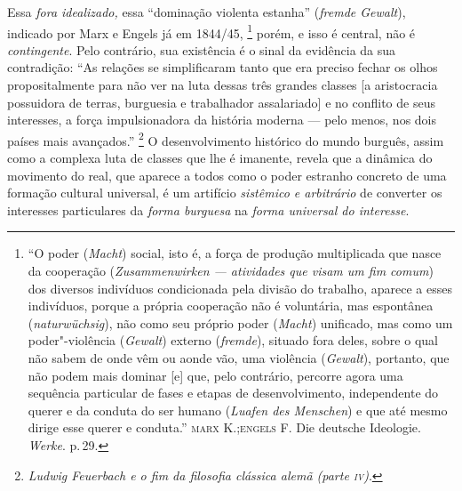 Essa \emph{fora idealizado,} essa ``dominação violenta estanha''
(\emph{fremde Gewalt}), indicado por Marx e Engels já em 1844/45,
\footnote{``O poder (\emph{Macht}) social, isto é, a força de produção
  multiplicada que nasce da cooperação (\emph{Zusammenwirken ---
  atividades que visam um fim comum}) dos diversos indivíduos
  condicionada pela divisão do trabalho, aparece a esses indivíduos,
  porque a própria cooperação não é voluntária, mas espontânea
  (\emph{naturwüchsig}), não como seu próprio poder (\emph{Macht})
  unificado, mas como um poder"-violência (\emph{Gewalt}) externo
  (\emph{fremde}), situado fora deles, sobre o qual não sabem de onde
  vêm ou aonde vão, uma violência (\emph{Gewalt}), portanto, que não
  podem mais dominar {[}e{]} que, pelo contrário, percorre agora uma
  sequência particular de fases e etapas de desenvolvimento,
  independente do querer e da conduta do ser humano (\emph{Luafen des
  Menschen}) e que até mesmo dirige esse querer e conduta.'' \textsc{marx}
  K.;\textsc{engels} F. Die deutsche Ideologie. \emph{Werke}. p.\,29.} porém, e
isso é central, não é \emph{contingente}. Pelo contrário, sua existência
é o sinal da evidência da sua contradição: ``As relações se
simplificaram tanto que era preciso fechar os olhos propositalmente para
não ver na luta dessas três grandes classes {[}a aristocracia possuidora
de terras, burguesia e trabalhador assalariado{]} e no conflito de seus
interesses, a força impulsionadora da história moderna --- pelo menos, nos
dois países mais avançados.'' \footnote{\emph{Ludwig Feuerbach e o fim
  da filosofia clássica alemã (parte \textsc{iv})}.} O desenvolvimento histórico
do mundo burguês, assim como a complexa luta de classes que lhe é
imanente, revela que a dinâmica do movimento do real, que aparece a
todos como o poder estranho concreto de uma formação cultural universal,
é um artifício \emph{sistêmico e arbitrário} de converter os interesses
particulares da \emph{forma burguesa} na \emph{forma universal do
interesse}.

